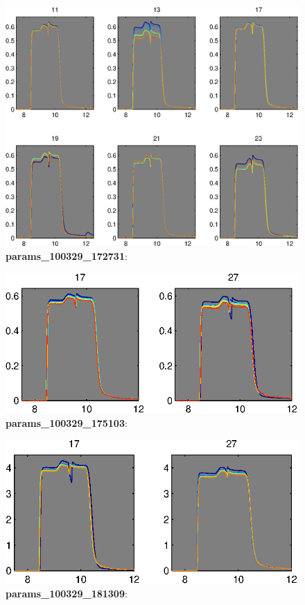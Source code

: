 \documentclass[a4paper]{report}
\begin{document}
\begin{figure}
\centering
\includegraphics[width=5in]{params_100329_172731.eps}
\caption{\textbf{params\_100329\_172731}:}
\end{figure}


\begin{figure}
\centering
\includegraphics[width=5in]{params_100329_175103.eps}
\caption{\textbf{params\_100329\_175103}:}
\end{figure}


\begin{figure}
\centering
\includegraphics[width=5in]{params_100329_181309.eps}
\caption{\textbf{params\_100329\_181309}:}
\end{figure}
\end{document}
